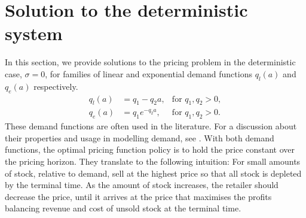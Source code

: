 \documentclass[main.tex]{subfiles}
\begin{document}
\section{Solution to the deterministic
  system}\label{sec:deterministic_hjb}
In this section, we provide solutions to the pricing problem in the
deterministic case, $\sigma = 0$, for families of linear and exponential
demand functions $q_l(a)$ and $q_e(a)$ respectively.
\begin{align}
  q_l(a)&=q_1-q_2a,&\text{for } q_1,q_2>0,\\
  q_e(a)&=q_1e^{-q_2a},&\text{for } q_1,q_2>0.
\end{align}
These demand functions are often used in the literature. For a discussion
about their properties and usage in modelling demand, see \citet[Ch.~7]{talluri2006theory}.
With both demand functions, the optimal pricing function policy is to hold the
price constant over the pricing horizon. They translate to the
following intuition: For small amounts of stock, relative to demand,
sell at the highest price so that all stock is depleted by the
terminal time. As the amount of stock increases, the retailer should
decrease the price, until it arrives at the price that maximises the
profits balancing revenue and cost of unsold stock at the terminal
time.
\end{document}
